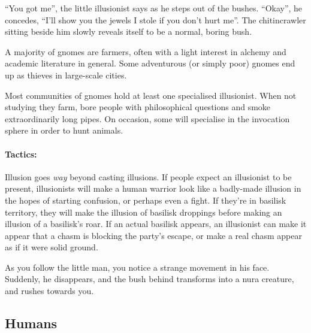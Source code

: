 \begin{multicols}{2}
\begin{boxtext}

  ``You got me'', the little illusionist says as he steps out of the bushes.
  ``Okay'', he concedes, ``I'll show you the jewels I stole if you don't hurt me''.
  The chitincrawler sitting beside him slowly reveals itself to be a normal, boring bush.

\end{boxtext}

\label{gnomish_citizen}

A majority of gnomes are farmers, often with a light interest in alchemy and academic literature in general.  Some adventurous (or simply poor) gnomes end up as thieves in large-scale cities.


\label{gnomish_illusionist}

Most communities of gnomes hold at least one specialised illusionist.  When not studying they farm, bore people with philosophical questions and smoke extraordinarily long pipes.  On occasion, some will specialise in the invocation sphere in order to hunt animals.


\paragraph{Tactics:} Illusion goes \emph{way} beyond casting illusions.
If people expect an illusionist to be present, illusionists will make a human warrior look like a badly-made illusion in the hopes of starting confusion, or perhaps even a fight.
If they're in basilisk territory, they will make the illusion of basilisk droppings before making an illusion of a basilisk's roar.
If an actual basilisk appears, an illusionist can make it appear that a chasm is blocking the party's escape, or make a real chasm appear as if it were solid ground.

\begin{boxtext}

  As you follow the little man, you notice a strange movement in his face.
  Suddenly, he disappears, and the bush behind transforms into a nura creature, and rushes towards you.

\end{boxtext}

\subsection{Humans}


\end{multicols}
